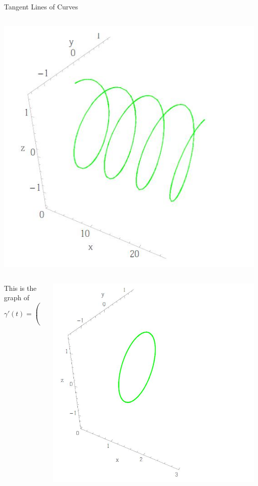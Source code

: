 \documentclass[smaller,hyperref={CJKbookmarks=true}]{beamer}
\begin{document}
\begin{frame}{Tangent Lines of Curves}
\begin{spacing}{1}
\begin{columns}[c,onlytextwidth]
\begin{column}{0.5\textwidth}
\includegraphics[width=\columnwidth]{85.jpg}
\end{column}
\end{columns}
\newpage
\begin{columns}[onlytextwidth]
\begin{column}{0.4\textwidth}
This is the graph of
\[\gamma'(t)=\begin{pmatrix}
               1 \\
               -\sin t \\
               \cos t
             \end{pmatrix}\]
\end{column}
\begin{column}{0.6\textwidth}
\includegraphics[width=\columnwidth]{86.jpg}

\end{column}
\end{columns}
\end{spacing}
\end{frame}
\end{document}
